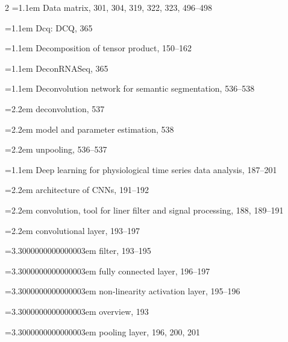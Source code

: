 \begin{multicols}{2}
\noindent\hangindent=1.1em Data matrix, 301, 304, 319, 322, 323, 496--498\par
\noindent\hangindent=1.1em Dcq: DCQ, 365\par
\noindent\hangindent=1.1em Decomposition of tensor product, 150--162\par
\noindent\hangindent=1.1em DeconRNASeq, 365\par
\noindent\hangindent=1.1em Deconvolution network for semantic segmentation, 536--538\par
\noindent\hangindent=2.2em \hspace*{1.1em}deconvolution, 537\par
\noindent\hangindent=2.2em \hspace*{1.1em}model and parameter estimation, 538\par
\noindent\hangindent=2.2em \hspace*{1.1em}unpooling, 536--537\par
\noindent\hangindent=1.1em Deep learning for physiological time series data analysis, 187--201\par
\noindent\hangindent=2.2em \hspace*{1.1em}architecture of CNNs, 191--192\par
\noindent\hangindent=2.2em \hspace*{1.1em}convolution, tool for liner filter and signal processing, 188, 189--191\par
\noindent\hangindent=2.2em \hspace*{1.1em}convolutional layer, 193--197\par
\noindent\hangindent=3.3000000000000003em \hspace*{2.2em}filter, 193--195\par
\noindent\hangindent=3.3000000000000003em \hspace*{2.2em}fully connected layer, 196--197\par
\noindent\hangindent=3.3000000000000003em \hspace*{2.2em}non-linearity activation layer, 195--196\par
\noindent\hangindent=3.3000000000000003em \hspace*{2.2em}overview, 193\par
\noindent\hangindent=3.3000000000000003em \hspace*{2.2em}pooling layer, 196, 200, 201\par

\end{multicols}
